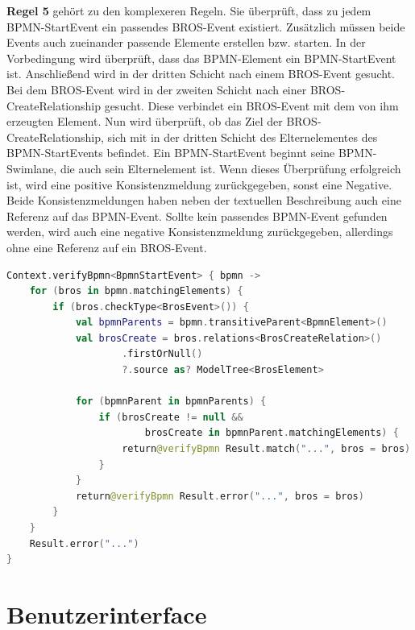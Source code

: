 \textbf{Regel 5} gehört zu den komplexeren Regeln.
Sie überprüft, dass zu jedem BPMN-StartEvent ein passendes BROS-Event existiert.
Zusätzlich müssen beide Events auch zueinander passende Elemente erstellen bzw. starten.
In der Vorbedingung wird überprüft, dass das BPMN-Element ein BPMN-StartEvent ist.
Anschließend wird in der dritten Schicht nach einem BROS-Event gesucht.
Bei dem BROS-Event wird in der zweiten Schicht nach einer BROS-CreateRelationship gesucht.
Diese verbindet ein BROS-Event mit dem von ihm erzeugten Element.
Nun wird überprüft, ob das Ziel der BROS-CreateRelationship, sich mit in der dritten Schicht des Elternelementes des BPMN-StartEvents befindet.
Ein BPMN-StartEvent beginnt seine BPMN-Swimlane, die auch sein Elternelement ist.
Wenn dieses Überprüfung erfolgreich ist, wird eine positive Konsistenzmeldung zurückgegeben, sonst eine Negative.
Beide Konsistenzmeldungen haben neben der textuellen Beschreibung auch eine Referenz auf das BPMN-Event.
Sollte kein passendes BPMN-Event gefunden werden, wird auch eine negative Konsistenzmeldung zurückgegeben, allerdings ohne eine Referenz auf ein BROS-Event.

\begin{lstlisting}[language=Kotlin, caption=Implementierung von Regel 5, label=lst:implementation_rule_5,float,floatplacement=H, xleftmargin=.05\textwidth, xrightmargin=.05\textwidth]
Context.verifyBpmn<BpmnStartEvent> { bpmn ->
    for (bros in bpmn.matchingElements) {
        if (bros.checkType<BrosEvent>()) {
            val bpmnParents = bpmn.transitiveParent<BpmnElement>()
            val brosCreate = bros.relations<BrosCreateRelation>()
                    .firstOrNull()
                    ?.source as? ModelTree<BrosElement>

            for (bpmnParent in bpmnParents) {
                if (brosCreate != null && 
                        brosCreate in bpmnParent.matchingElements) {
                    return@verifyBpmn Result.match("...", bros = bros)
                }
            }
            return@verifyBpmn Result.error("...", bros = bros)
        }
    }
    Result.error("...")
}
\end{lstlisting}

\section{Benutzerinterface}

